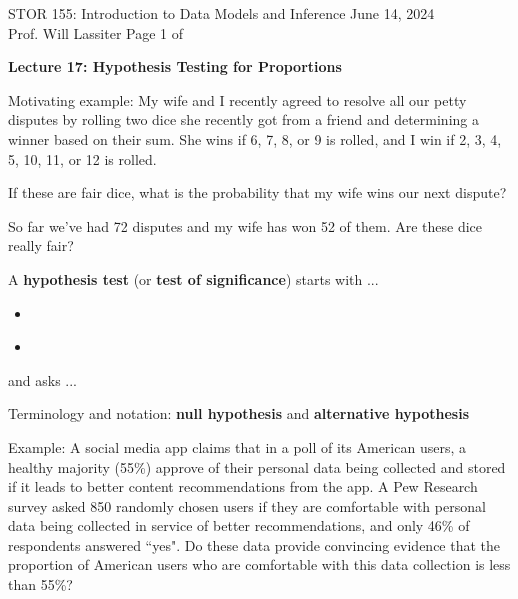 \documentclass[11pt,letterpaper,twoside]{article}
\newcommand{\whatizit}{Lecture 17: Hypothesis Testing for Proportions}
\begin{document}
\thispagestyle{empty} \vspace*{-0.75in}

{\bssten STOR 155: Introduction to Data Models and Inference \hfill June 14, 2024 \\
Prof. Will Lassiter  \hfill Page 1 of \pageref{totalpag}}
\vspace{10pt}
\begin{center} {{\Large \bf \whatizit}} \end{center}

Motivating example: My wife and I recently agreed to resolve all our petty disputes by rolling two dice she recently got from a friend and determining a winner based on their sum. She wins if 6, 7, 8, or 9 is rolled, and I win if 2, 3, 4, 5, 10, 11, or 12 is rolled. \vspace{6pt}

If these are fair dice, what is the probability that my wife wins our next dispute? \vspace{80pt}

So far we've had 72 disputes and my wife has won 52 of them.  Are these dice really fair? \vspace{200pt}

A {\bf hypothesis test} (or {\bf test of significance}) starts with ...

\begin{itemize}

\item \ \vspace{50pt}

\item \ \vspace{50pt}

\end{itemize}

and asks ...

\newpage

Terminology and notation: {\bf null hypothesis} and {\bf alternative hypothesis} \vspace{150pt}

Example: A social media app claims that in a poll of its American users, a healthy majority (55\%) approve of their personal data being collected and stored if it leads to better content recommendations from the app. A Pew Research survey asked 850 randomly chosen users if they are comfortable with personal data being collected in service of better recommendations, and only 46\% of respondents answered ``yes". Do these data provide convincing evidence that the proportion of American users who are comfortable with this data collection is less than 55\%? 
\end{document}
